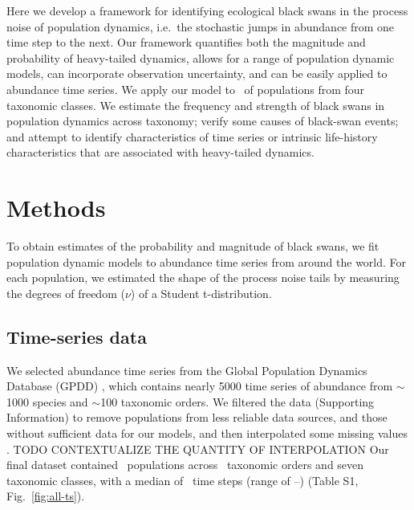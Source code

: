 Here we develop a framework for identifying ecological black swans in the process noise of population dynamics, i.e.\ the stochastic jumps in abundance from one time step to the next. Our framework quantifies both the magnitude and probability of heavy-tailed dynamics, allows for a range of population dynamic models, can incorporate observation uncertainty, and can be easily applied to abundance time series. We apply our model to \NPops\ of populations from four taxonomic classes. We estimate the frequency and strength of black swans in population dynamics across taxonomy; verify some causes of black-swan events; and attempt to identify characteristics of time series or intrinsic life-history characteristics that are associated with heavy-tailed dynamics.

\section{Methods}

To obtain estimates of the probability and magnitude of black swans, we fit population dynamic models to abundance time series from around the world. For each population, we estimated the shape of the process noise tails by measuring the degrees of freedom ($\nu$) of a Student t-distribution.

\subsection{Time-series data}

We selected abundance time series from the Global Population Dynamics Database (GPDD) \citep{gpdd2010}, which contains nearly 5000 time series of abundance from $\sim$1000 species and $\sim$100 taxonomic orders. We filtered the data (Supporting Information) to remove populations from less reliable data sources, and those without sufficient data for our models, and then interpolated some missing values \citep[\textit{sensu}][]{brook2006a}. TODO CONTEXTUALIZE THE QUANTITY OF INTERPOLATION Our final dataset contained \NPops~populations across \NOrders~taxonomic orders and seven taxonomic classes, with a median of \medianTimeSteps~time steps (range of \minTimeSteps--\maxTimeSteps) (Table S1, Fig.~\ref{fig:all-ts}).

